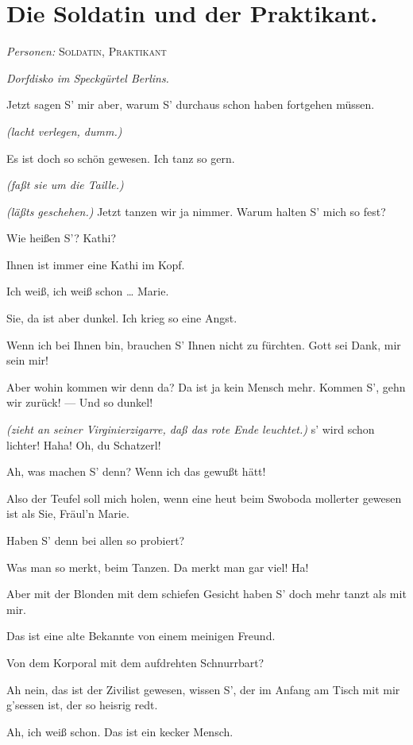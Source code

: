 \documentclass[
	final,
	a4paper,
	ngerman,
	mpinclude = true, %
	twoside = true,
	open = right,
	cleardoublepage = plain,
	DIV = 13,
	BCOR = 1cm,
	titlepage = firstiscover,
	]{scrbook}
\newcommand{\scene}{\section}
\newcommand{\direction}[1]{\textit{(#1)}}
\newcommand{\setting}[1]{\vspace{-0.5\baselineskip}\centering\textit{#1}}
\newcommand{\characterlist}[1]{{\begin{center}\textit{Personen:} #1\end{center}}}
\newcommand{\thecharacter}[1]{\textup{\textsc{#1}}\xspace}
\newcommand{\thesoldat}{\thecharacter{Soldatin}}
\newcommand{\thepraktikant}{\thecharacter{Praktikant}}
\newcommand{\character}[1]{\item[#1:]}
\newcommand{\soldat}{\character{\thesoldat}}
\newcommand{\praktikant}{\character{\thepraktikant}}
\begin{document}
\scene{Die Soldatin und der Praktikant.}
\characterlist{\thesoldat, \thepraktikant}
\setting{Dorfdisko im Speckgürtel Berlins.}
\begin{play}


	\praktikant
	Jetzt sagen S' mir aber, warum S' durchaus schon haben fortgehen müssen.

	\soldat
	\direction{lacht verlegen, dumm.}

	\praktikant
	Es ist doch so schön gewesen. Ich tanz so gern.

	\soldat
	\direction{faßt sie um die Taille.}

	\praktikant
	\direction{läßts geschehen.} Jetzt tanzen wir ja nimmer. Warum halten S' mich so fest?

	\soldat
	Wie heißen S'? Kathi?

	\praktikant
	Ihnen ist immer eine Kathi im Kopf.

	\soldat
	Ich weiß, ich weiß schon \ldots{} Marie.

	\praktikant
	Sie, da ist aber dunkel. Ich krieg so eine Angst.

	\soldat
	Wenn ich bei Ihnen bin, brauchen S' Ihnen nicht zu fürchten. Gott sei Dank, mir sein mir!

	\praktikant
	Aber wohin kommen wir denn da? Da ist ja kein Mensch mehr. Kommen S', gehn wir zurück! --- Und so dunkel!

	\soldat
	\direction{zieht an seiner Virginierzigarre, daß das rote Ende leuchtet.} s' wird schon lichter! Haha! Oh, du Schatzerl!

	\praktikant
	Ah, was machen S' denn? Wenn ich das gewußt hätt!

	\soldat
	Also der Teufel soll mich holen, wenn eine heut beim Swoboda mollerter gewesen ist als Sie, Fräul'n Marie.

	\praktikant
	Haben S' denn bei allen so probiert?

	\soldat
	Was man so merkt, beim Tanzen. Da merkt man gar viel! Ha!

	\praktikant
	Aber mit der Blonden mit dem schiefen Gesicht haben S' doch mehr tanzt als mit mir.

	\soldat
	Das ist eine alte Bekannte von einem meinigen Freund.

	\praktikant
	Von dem Korporal mit dem aufdrehten Schnurrbart?

	\soldat
	Ah nein, das ist der Zivilist gewesen, wissen S', der im Anfang am Tisch mit mir g'sessen ist, der so heisrig redt.

	\praktikant
	Ah, ich weiß schon. Das ist ein kecker Mensch.


\end{play}
\end{document}
